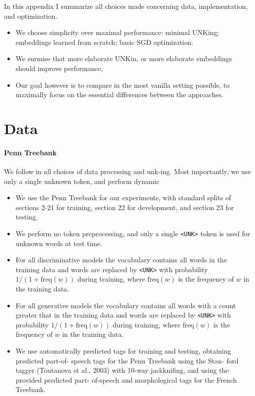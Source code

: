 % 

In this appendix I summarize all choices made concerning data, implementation, and optimization.
\begin{itemize}
  \item We choose simplicity over maximal performance: minimal UNKing; embeddings learned from scratch; basic SGD optimization.
  \item We surmise that more elaborate UNKin, or more elaborate embeddings should improve performance,
  \item Our goal however is to compare in the most vanilla setting possible, to maximally focus on the essential differences between the approaches.
\end{itemize}

\section{Data}

\paragraph{Penn Treebank}
We follow \citet{stern2017minimal} in all choices of data processing and unk-ing. Most importantly, we use only a single unknown token, and perform dynamic
\begin{itemize}
  \item We use the Penn Treebank \citep{marcus1993penn} for our experiments, with standard splits of sections 2-21 for training, section 22 for development, and section 23 for testing.
  \item We perform no token preprocessing, and only a single \texttt{<UNK>} token is used for unknown words at test time.
  \item For all discriminative models the vocabulary contains all words in the training data and words are replaced by \texttt{<UNK>} with probability $1 / (1 + \text{freq}(w))$ during training, where $\text{freq}(w)$ is the frequency of $w$ in the training data.
  \item For all generative models the vocabulary contains all words with a count greater that  in the training data and words are replaced by \texttt{<UNK>} with probability $1 / (1 + \text{freq}(w))$ during training, where $\text{freq}(w)$ is the frequency of $w$ in the training data.
  \item We use automatically predicted tags for training and testing, obtaining predicted part-of- speech tags for the Penn Treebank using the Stan- ford tagger (Toutanova et al., 2003) with 10-way jackknifing, and using the provided predicted part- of-speech and morphological tags for the French Treebank.
\end{itemize}

